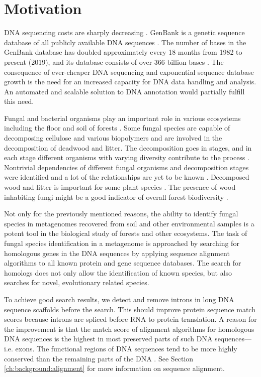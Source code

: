 \chapter{\label{ch:motivation}Motivation}

\minitoc

DNA sequencing costs are sharply decreasing \cite{NHGRI_sequencing_costs}.
GenBank is a genetic sequence database of all publicly available DNA sequences
\cite{benson2012genbank}. The number of bases in the GenBank database has
doubled approximately every 18 months from 1982 to present (2019), and its
database consists of over 366 billion bases \cite{genbank_release_notes}. The
consequence of ever-cheaper DNA sequencing and exponential sequence database
growth is the need for an increased capacity for DNA data handling and
analysis. An automated and scalable solution to DNA annotation would partially
fulfill this need.

Fungal and bacterial organisms play an important role in various ecosystems
including the floor and soil of forests
\cite{christensen2005wood}\cite{bani2018role}. Some fungal species are capable
of decomposing cellulose and various biopolymers and are involved in the
decomposition of deadwood and litter. The decomposition goes in stages, and in
each stage different organisms with varying diversity contribute to the process
\cite{bani2018role}. Nontrivial dependencies of different fungal organisms and
decomposition stages were identified and a lot of the relationships are yet to
be known \cite{bani2018role}. Decomposed wood and litter is important for some
plant species \cite{bani2018role}. The presence of wood inhabiting fungi might
be a good indicator of overall forest biodiversity \cite{christensen2005wood}.

Not only for the previously mentioned reasons, the ability to identify fungal
species in metagenomes recovered from soil and other environmental samples is a
potent tool in the biological study of forests and other ecosystems. The task
of fungal species identification in a metagenome is approached by searching for
homologous genes in the DNA sequences by applying sequence alignment algorithms
to all known protein and gene sequence databases. The search for homologs does
not only allow the identification of known species, but also searches for
novel, evolutionary related species.

To achieve good search results, we detect and remove introns in long DNA
sequence scaffolds before the search. This should improve protein sequence
match scores because introns are spliced before RNA to protein translation. A
reason for the improvement is that the match score of alignment algorithms for
homologous DNA sequences is the highest in most preserved parts of such DNA
sequences---i.e. exons. The functional regions of DNA sequences tend to be more
highly conserved than the remaining parts of the DNA
\cite{morgenstern2002exon}. See Section \ref{ch:background:alignment} for more
information on sequence alignment.

